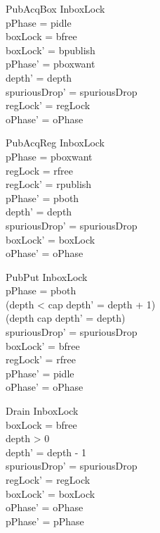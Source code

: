 \documentclass[a4paper,10pt,fleqn]{article}
\begin{document}

\begin{schema}{PubAcqBox}
  \Delta InboxLock \\
\where
  pPhase = pidle \\
  boxLock = bfree \\
  boxLock' = bpublish \\
  pPhase' = pboxwant \\
  depth' = depth \\
  spuriousDrop' = spuriousDrop \\
  regLock' = regLock \\
  oPhase' = oPhase
\end{schema}

\begin{schema}{PubAcqReg}
  \Delta InboxLock \\
\where
  pPhase = pboxwant \\
  regLock = rfree \\
  regLock' = rpublish \\
  pPhase' = pboth \\
  depth' = depth \\
  spuriousDrop' = spuriousDrop \\
  boxLock' = boxLock \\
  oPhase' = oPhase
\end{schema}

\begin{schema}{PubPut}
  \Delta InboxLock \\
\where
  pPhase = pboth \\
  (depth < cap \implies depth' = depth + 1) \\
  (depth \geq cap \implies depth' = depth) \\
  spuriousDrop' = spuriousDrop \\
  boxLock' = bfree \\
  regLock' = rfree \\
  pPhase' = pidle \\
  oPhase' = oPhase
\end{schema}

\begin{schema}{Drain}
  \Delta InboxLock \\
\where
  boxLock = bfree \\
  depth > 0 \\
  depth' = depth - 1 \\
  spuriousDrop' = spuriousDrop \\
  regLock' = regLock \\
  boxLock' = boxLock \\
  oPhase' = oPhase \\
  pPhase' = pPhase
\end{schema}
\end{document}
